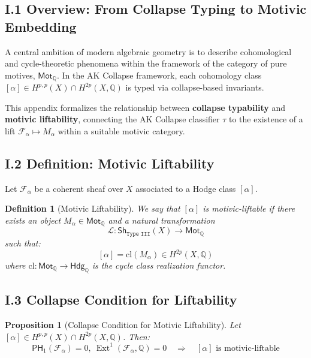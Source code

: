 \documentclass[11pt]{article}
\newtheorem{definition}[theorem]{Definition}
\newtheorem{proposition}[theorem]{Proposition}
\DeclareMathOperator{\Ext}{Ext}
\begin{document}

\subsection*{I.1 Overview: From Collapse Typing to Motivic Embedding}

A central ambition of modern algebraic geometry is to describe cohomological and cycle-theoretic phenomena within the framework of the category of pure motives, $\mathsf{Mot}_\mathbb{Q}$. In the AK Collapse framework, each cohomology class $[\alpha] \in H^{p,p}(X) \cap H^{2p}(X, \mathbb{Q})$ is typed via collapse-based invariants.

This appendix formalizes the relationship between \textbf{collapse typability} and \textbf{motivic liftability}, connecting the AK Collapse classifier $\tau$ to the existence of a lift $\mathcal{F}_\alpha \mapsto M_\alpha$ within a suitable motivic category.

\subsection*{I.2 Definition: Motivic Liftability}

Let $\mathcal{F}_\alpha$ be a coherent sheaf over $X$ associated to a Hodge class $[\alpha]$.

\begin{definition}[Motivic Liftability]
We say that $[\alpha]$ is \emph{motivic-liftable} if there exists an object $M_\alpha \in \mathsf{Mot}_\mathbb{Q}$ and a natural transformation
\[
\mathcal{L} : \mathsf{Sh}_{\texttt{Type III}}(X) \to \mathsf{Mot}_\mathbb{Q}
\]
such that:
\[
[\alpha] = \mathrm{cl}(M_\alpha) \in H^{2p}(X, \mathbb{Q})
\]
where $\mathrm{cl}: \mathsf{Mot}_\mathbb{Q} \to \mathsf{Hdg}_\mathbb{Q}$ is the cycle class realization functor.
\end{definition}

\subsection*{I.3 Collapse Condition for Liftability}

\begin{proposition}[Collapse Condition for Motivic Liftability]
Let $[\alpha] \in H^{p,p}(X) \cap H^{2p}(X, \mathbb{Q})$. Then:
\[
\mathsf{PH}_1(\mathcal{F}_\alpha) = 0, \ \Ext^1(\mathcal{F}_\alpha, \mathbb{Q}) = 0 \quad \Rightarrow \quad [\alpha] \text{ is motivic-liftable}
\]
\end{proposition}
\end{document}
